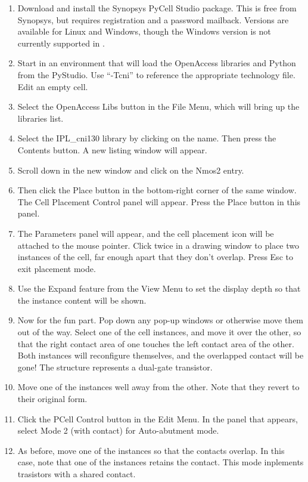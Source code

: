 \begin{enumerate}
\item{Download and install the Synopsys PyCell Studio package.  This
is free from Synopsys, but requires registration and a password
mailback.  Versions are available for Linux and Windows, though the
Windows version is not currently supported in {\Xic}.}

\item{Start {\Xic} in an environment that will load the OpenAccess
libraries and Python from the PyStudio.  Use ``{\vt -Tcni}'' to
reference the appropriate technology file.  Edit an empty cell.}

\item{Select the {\cb OpenAccess Libs} button in the {\cb File Menu},
which will bring up the libraries list.}

\item{Select the {\vt IPL\_cni130} library by clicking on the name. 
Then press the {\cb Contents} button.  A new listing window will
appear.}

\item{Scroll down in the new window and click on the {\vt Nmos2}
entry.}

\item{Then click the {\cb Place} button in the bottom-right corner of
the same window.  The {\cb Cell Placement Control} panel will appear. 
Press the {\cb Place} button in this panel.}

\item{The {\cb Parameters} panel will appear, and the cell placement
icon will be attached to the mouse pointer.  Click twice in a drawing
window to place two instances of the cell, far enough apart that they
don't overlap.  Press {\cb Esc} to exit placement mode.}

\item{Use the {\cb Expand} feature from the {\cb View Menu} to set the
display depth so that the instance content will be shown.}

\item{Now for the fun part.  Pop down any pop-up windows or otherwise
move them out of the way.  Select one of the cell instances, and move
it over the other, so that the right contact area of one touches the
left contact area of the other.  Both instances will reconfigure
themselves, and the overlapped contact will be gone!  The structure
represents a dual-gate transistor.}

\item{Move one of the instances well away from the other.  Note that
they revert to their original form.}

\item{Click the {\cb PCell Control} button in the {\cb Edit Menu}.  In
the panel that appears, select {\cb Mode 2 (with contact)} for {\cb
Auto-abutment mode}.}

\item{As before, move one of the instances so that the contacts
overlap.  In this case, note that one of the instances retains the
contact.  This mode inplements trasistors with a shared contact.}
\end{enumerate}

